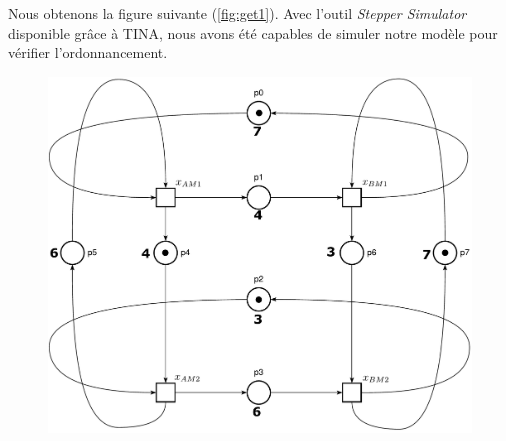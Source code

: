 Nous obtenons la figure suivante (\ref{fig:get1}). Avec l'outil \emph{Stepper Simulator} disponible grâce à TINA, nous avons été capables de simuler notre modèle pour vérifier l'ordonnancement.
\begin{figure}
\begin{center}
\includegraphics[width = .75\textwidth]{./II/images/GET_1.pdf}
\end{center}
\end{figure}
 
